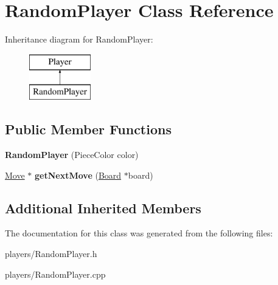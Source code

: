 \hypertarget{class_random_player}{}\section{Random\+Player Class Reference}
\label{class_random_player}
Inheritance diagram for Random\+Player\+:\begin{figure}[H]
\begin{center}
\leavevmode
\includegraphics[height=2.000000cm]{class_random_player}
\end{center}
\end{figure}
\subsection*{Public Member Functions}
\begin{DoxyCompactItemize}
\item 
\mbox{\label{class_random_player_a35590a358c0ef6dec72e7b33bfd98e36}} 
{\bfseries Random\+Player} (Piece\+Color color)
\item 
\mbox{\label{class_random_player_a12cb9e352db576ba61dad3dce938e4d8}} 
\mbox{\hyperlink{class_move}{Move}} $\ast$ {\bfseries get\+Next\+Move} (\mbox{\hyperlink{class_board}{Board}} $\ast$board)
\end{DoxyCompactItemize}
\subsection*{Additional Inherited Members}


The documentation for this class was generated from the following files\+:\begin{DoxyCompactItemize}
\item 
players/Random\+Player.\+h\item 
players/Random\+Player.\+cpp\end{DoxyCompactItemize}
